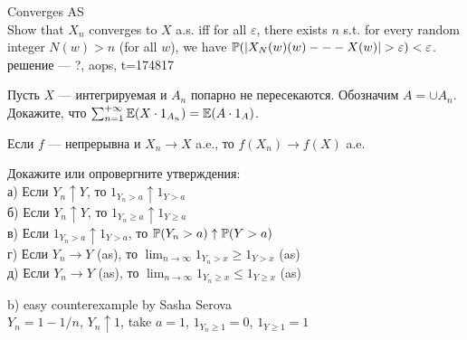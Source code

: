 \begin{solution}
\begin{solution}
\begin{solution}
\begin{solution}
\begin{solution}
\end{solution}

\begin{problem}
Converges AS\\
Show that $X_{n}$ converges to $X$ a.s. iff for all $\varepsilon$, there exists $n$ s.t. for every random integer $N(w)>n$ (for all $w$), we have $\P(|X_N(w) (w) --- X (w)| > \varepsilon) <\varepsilon$.\\
решение --- ?, aops, t=174817 
\end{problem} 
\begin{solution} 

\end{solution}

\begin{problem}
Пусть $X$ --- интегрируемая и $A_{n}$ попарно не пересекаются.
Обозначим $A=\cup A_{n}$. Докажите, что
$\sum_{n=1}^{+\infty}\E(X\cdot 1_{A_{n}})=\E(A\cdot 1_{A})$. 
\end{problem} 
\begin{solution} 

\end{solution}

\begin{problem}
Если $f$ --- непрерывна и $X_{n}\rightarrow X$ a.e., то
$f(X_{n})\rightarrow f(X)$ a.e.
\end{problem} 
\begin{solution} 

\end{solution}

\begin{problem}
Докажите или опровергните утверждения: \\
а) Если $Y_{n}\uparrow Y$, то $1_{Y_{n}>a}\uparrow 1_{Y>a}$ \\
б) Если $Y_{n}\uparrow Y$, то $1_{Y_{n}\ge a}\uparrow 1_{Y\ge a}$ \\
в) Если $1_{Y_{n}>a}\uparrow 1_{Y>a}$, то $\P(Y_{n}>a)\uparrow
\P(Y>a)$ \\
г) Если $Y_{n}\rightarrow Y$ (as), то
$\lim_{n\to\infty}1_{Y_{n}>x}\ge 1_{Y>x}$ (as) \\
д) Если $Y_{n}\rightarrow Y$ (as), то
$\lim_{n\to\infty}1_{Y_{n}\ge x}\le 1_{Y\ge x}$ (as) 
\end{problem} 
\begin{solution} 

b) easy counterexample by Sasha Serova \\
$Y_{n}=1-1/n$, $Y_{n}\uparrow 1$, take $a=1$, $1_{Y_{n}\ge 1}=0$,
$1_{Y\ge 1}=1$ 
\end{solution}


\end{solution}
\end{solution}
\end{solution}
\end{solution}
